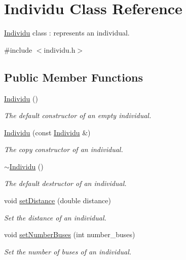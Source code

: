 \hypertarget{class_individu}{}\section{Individu Class Reference}
\label{class_individu}


\hyperlink{class_individu}{Individu} class \+: represents an individual.  




{\ttfamily \#include $<$individu.\+h$>$}

\subsection*{Public Member Functions}
\begin{DoxyCompactItemize}
\item 
\hyperlink{class_individu_ac35091404cfbf11946694806aefa9e7e}{Individu} ()
\begin{DoxyCompactList}\small\item\em The default constructor of an empty individual. \end{DoxyCompactList}\item 
\hyperlink{class_individu_a73c8148ec030d8b008c4a60a62738198}{Individu} (const \hyperlink{class_individu}{Individu} \&)
\begin{DoxyCompactList}\small\item\em The copy constructor of an individual. \end{DoxyCompactList}\item 
\hyperlink{class_individu_a84dcf2842927993d6c9ab833dfb6997a}{$\sim$\+Individu} ()
\begin{DoxyCompactList}\small\item\em The default destructor of an individual. \end{DoxyCompactList}\item 
void \hyperlink{class_individu_ae7b6566767a9e1b65207eba6c466e033}{set\+Distance} (double distance)
\begin{DoxyCompactList}\small\item\em Set the distance of an individual. \end{DoxyCompactList}\item 
void \hyperlink{class_individu_a85d185d2480ae6c279937bc4334190c6}{set\+Number\+Buses} (int number\+\_\+buses)
\begin{DoxyCompactList}\small\item\em Set the number of buses of an individual. \end{DoxyCompactList}\item 

\end{DoxyCompactItemize}
